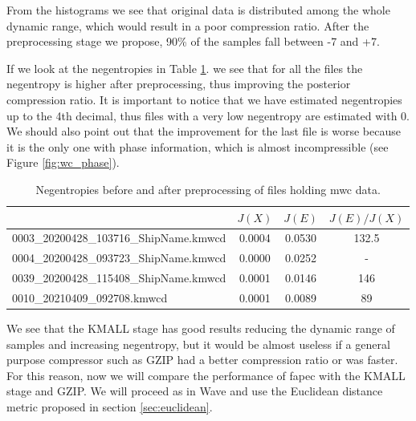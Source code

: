 From the histograms we see that original data is distributed among the whole dynamic range, which would result in a poor compression ratio. After the preprocessing stage we propose, 90\% of the samples fall between -7 and +7.

If we look at the negentropies in Table \ref{tab:negentropies_kmall}. we see that for all the files the negentropy is higher after preprocessing, thus improving the posterior compression ratio. It is important to notice that we have estimated negentropies up to the 4th decimal, thus files with a very low negentropy are estimated with 0. We should also point out that the improvement for the last file is worse because it is the only one with phase information, which is almost incompressible (see Figure \ref{fig:wc_phase}).

\begin{table}[h!]
\normalsize
\centering
\begin{tabular}{|l|c|c|c|}
	\hline
	\rowcolor[HTML]{d6cefc} 
	\multicolumn{1}{|c|}{\cellcolor[HTML]{d6cefc}Filename}         & $J(X)$                           & $J(E)$                           & $J(E)/J(X)$ \\ \hline
	\cellcolor[HTML]{FFFFFF}0003\_20200428\_103716\_ShipName.kmwcd & \cellcolor[HTML]{FFFFFF}0.0004 & \cellcolor[HTML]{FFFFFF}0.0530 & 132.5     \\ \hline
	\cellcolor[HTML]{FFFFFF}0004\_20200428\_093723\_ShipName.kmwcd & \cellcolor[HTML]{FFFFFF}0.0000      & \cellcolor[HTML]{FFFFFF}0.0252 & -         \\ \hline
	\cellcolor[HTML]{FFFFFF}0039\_20200428\_115408\_ShipName.kmwcd & \cellcolor[HTML]{FFFFFF}0.0001 & \cellcolor[HTML]{FFFFFF}0.0146 & 146       \\ \hline
	0010\_20210409\_092708.kmwcd                                   & 0.0001                         & 0.0089                         & 89        \\ \hline
\end{tabular}
\caption{Negentropies before and after preprocessing of files holding \acrshort{mwc} data.}
\label{tab:negentropies_kmall}
\end{table}

We see that the KMALL stage has good results reducing the dynamic range of samples and increasing negentropy, but it would be almost useless if a general purpose compressor such as GZIP had a better compression ratio or was faster. For this reason, now we will compare the performance of \acrshort{fapec} with the KMALL stage and GZIP. We will proceed as in Wave and use the Euclidean distance metric proposed in section \ref{sec:euclidean}.

